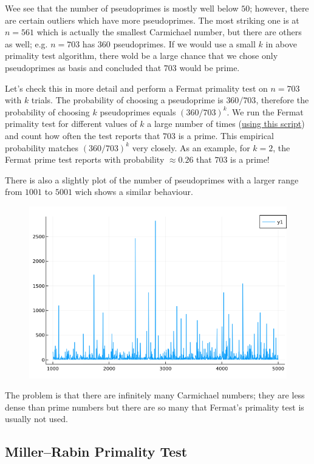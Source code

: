 Wee see that the number of pseudoprimes is mostly well below $50$; however, there are certain outliers which have more pseudoprimes. The most striking one is at $n=561$ which is actually the smallest Carmichael number, but there are others as well; e.g. $n = 703$ has $360$ pseudoprimes. If we would use a small $k$ in above primality test algorithm, there wold be a large chance that we chose only pseudoprimes as basis and concluded that $703$ would be prime.

Let's check this in more detail and perform a Fermat primality test on $n = 703$ with $k$ trials. The probability of choosing a pseudoprime is $360/703$, therefore the probability of choosing $k$ pseudoprimes equals $(360/703)^k$. We run the Fermat primality test for different values of $k$ a large number of times (\href{https://github.com/ClemensFMN/JuliaStuff/blob/master/NumberTheory/pseudo_primes_fermat.jl}{using this script}) and count how often the test reports that $703$ is a prime. This empirical probability matches $(360/703)^k$ very closely. As an example, for $k=2$, the Fermat prime test reports with probability $\approx 0.26$ that $703$ is a prime!


There is also a slightly plot of the number of pseudoprimes with a larger range from $1001$ to $5001$ wich shows a similar behaviour.

\begin{figure}[H]
    \centering
    \includegraphics[scale=0.6]{images/2021-04-06-pseudo_primes_2.png}
\end{figure}

The problem is that there are infinitely many Carmichael numbers; they are less dense than prime numbers but there are so many that Fermat's primality test is usually not used.

\subsection{Miller–Rabin Primality Test}



